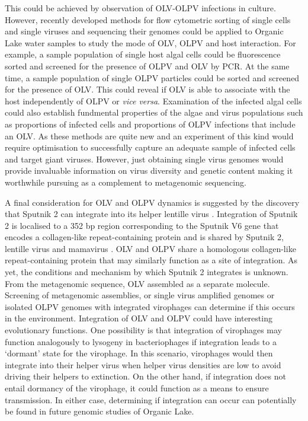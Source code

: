 This could be achieved by observation of \ac{OLV}-\ac{OLPV} infections in culture.
However, recently developed methods for flow cytometric sorting of single cells and single viruses and sequencing their genomes \cite{Martinez-Martinez2011, Allen2011} could be applied to Organic Lake water samples to study the mode of \ac{OLV}, \ac{OLPV} and host interaction.
For example, a sample population of single host algal cells could be fluorescence sorted and screened for the presence of \ac{OLPV} and \ac{OLV} by \acs{PCR}.
At the same time, a sample population of single \ac{OLPV} particles could be sorted and screened for the presence of \ac{OLV}.
This could reveal if \ac{OLV} is able to associate with the host independently of \ac{OLPV} or \emph{vice versa}.
Examination of the infected algal cells could also establish fundmental properties of the algae and virus populations such as proportions of infected cells and proportions of \ac{OLPV} infections that include an \ac{OLV}.
As these methods are quite new and an experiment of this kind would require optimisation to successfully capture an adequate sample of infected cells and target giant viruses.
However, just obtaining single virus genomes would provide invaluable information on virus diversity and genetic content making it worthwhile pursuing as a complement to metagenomic sequencing.

A final consideration for \ac{OLV} and \ac{OLPV} dynamics is suggested by the discovery that Sputnik 2 can integrate into its helper lentille virus \cite{Desnues2012}.
Integration of Sputnik 2 is localised to a 352 bp region corresponding to the Sputnik V6 gene that encodes a collagen-like repeat-containing protein and is shared by Sputnik 2, lentille virus and mamavirus  \cite{Desnues2012}. 
\ac{OLV} and \ac{OLPV} share a homologous collagen-like repeat-containing protein that may similarly function as a site of integration.
As yet, the conditions and mechanism by which Sputnik 2 integrates is unknown.
From the metagenomic sequence, \ac{OLV} assembled as a separate molecule.
Screening of metagenomic assemblies, or single virus amplified genomes or isolated \ac{OLPV} genomes with integrated virophages can determine if this occurs in the environment.
Integration of \ac{OLV} and \ac{OLPV} could have interesting evolutionary functions.
One possibility is that integration of virophages may function analogously to lysogeny in bacteriophages if integration leads to a `dormant' state for the virophage.
In this scenario, virophages would then integrate into their helper virus when helper virus densities are low to avoid driving their helpers to extinction.
On the other hand, if integration does not entail dormancy of the virophage, it could function as a means to ensure transmission.
In either case, determining if integration can occur can potentially be found in future genomic studies of Organic Lake.

